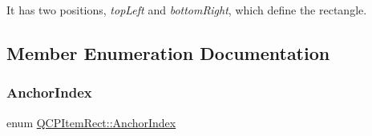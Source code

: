 It has two positions, {\itshape top\+Left} and {\itshape bottom\+Right}, which define the rectangle. 

\subsection{Member Enumeration Documentation}
\mbox{\label{class_q_c_p_item_rect_af0ebba58e6bca4851c4db726691ec0d3}} 
\subsubsection{\texorpdfstring{AnchorIndex}{AnchorIndex}}
{\footnotesize\ttfamily enum \mbox{\hyperlink{class_q_c_p_item_rect_af0ebba58e6bca4851c4db726691ec0d3}{Q\+C\+P\+Item\+Rect\+::\+Anchor\+Index}}\hspace{0.3cm}{\ttfamily [protected]}}

